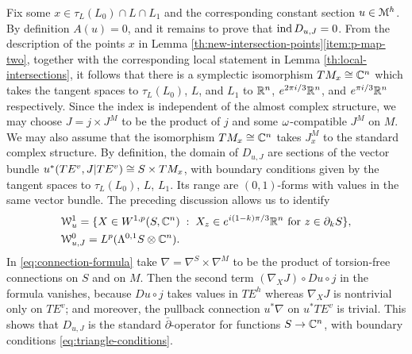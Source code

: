 \documentclass[10pt,letterpaper]{article}
\begin{document}
Fix some $x \in \tau_L(L_0) \cap L \cap L_1$ and the corresponding constant
section $u \in \mathcal{M}^h$. By definition $A(u) = 0$, and it remains to prove that
$\mathrm{ind}\,D_{u,J} = 0$. From the description of the points $x$ in Lemma
\ref{th:new-intersection-points}\ref{item:p-map-two}, together with the
corresponding local statement in Lemma \ref{th:local-intersections}, it follows
that there is a symplectic isomorphism $TM_x \cong \mathbb{C}^n$ which takes the tangent
spaces to $\tau_L(L_0)$, $L$, and $L_1$ to $\mathbb{R}^n$, $e^{2 \pi i/3}\mathbb{R}^n$, and
$e^{\pi i/3}\mathbb{R}^n$ respectively. Since the index is independent of the almost
complex structure, we may choose $J = j \times J^M$ to be the product of $j$
and some $\omega$-compatible $J^M$ on $M$. We may also assume that the isomorphism
$TM_x \cong \mathbb{C}^n$ takes $J^M_x$ to the standard complex structure. By
definition, the domain of $D_{u,J}$ are sections of the vector bundle
$u^*(TE^v,J|TE^v) \cong S \times TM_x$, with boundary conditions given by the
tangent spaces to $\tau_L(L_0)$, $L$, $L_1$. Its range are $(0,1)$-forms with
values in the same vector bundle. The preceding discussion allows us to
identify
\begin{equation} \label{eq:triangle-conditions}
\begin{split}
 & \mathcal{W}^1_u = \{ X \in W^{1,p}(S,\mathbb{C}^n) \; : \;
 X_z \in e^{i(1-k)\pi/3}\mathbb{R}^n \text{ for $z \in \partial_kS$} \}, \\
 & \mathcal{W}^0_{u,J} = L^p(\Lambda^{0,1}S \otimes \mathbb{C}^n).
\end{split}
\end{equation}
In \eqref{eq:connection-formula} take $\nabla = \nabla^{S} \times \nabla^M$ to
be the product of torsion-free connections on $S$ and on $M$. Then the second
term $(\nabla_X J) \circ Du \circ j$ in the formula vanishes, because $Du \circ
j$ takes values in $TE^h$ whereas $\nabla_X J$ is nontrivial only on $TE^v$;
and moreover, the pullback connection $u^*\nabla$ on $u^*TE^v$ is trivial. This
shows that $D_{u,J}$ is the standard $\bar\partial$-operator for functions $S
\rightarrow \mathbb{C}^n$, with boundary conditions \eqref{eq:triangle-conditions}.
%
%
\end{document}
